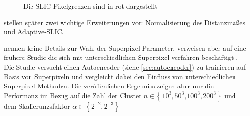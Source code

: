 \begin{figure}
    \centering
    \caption{Die SLIC-Pixelgrenzen sind in rot dargestellt }
    \label{fig:slic_parameters}
\end{figure}

\citeauthor{AchantaSLICSuperpixelsCompared2012} stellen später zwei wichtige Erweiterungen vor:
Normalisierung des Distanzmaßes und Adaptive-SLIC.

\citeauthor{ChenConvolutionalNeuralNetworks2017a} nennen keine Details zur Wahl
der Superpixel-Parameter, verweisen aber auf eine frühere Studie die sich mit unterschiedlichen 
Superpixel verfahren beschäftigt \parencite{ChenPageSegmentationHistorical2016}.
Die Studie versucht einen Autoencoder (siehe \ref{sec:autoencoder}) zu trainieren auf Basis von Superpixeln und vergleicht dabei den Einfluss von unterschiedlichen Superpixel-Methoden. Die veröffenlichen Ergebniss zeigen aber nur die Performanz im Bezug
auf die Zahl der Cluster \(n \in \left\{10^3, 50^3, 100^3, 200^3\right\}\) und dem Skalierungsfaktor \(\alpha \in \left\{2^{-2}, 2^{-3}\right\}\)

